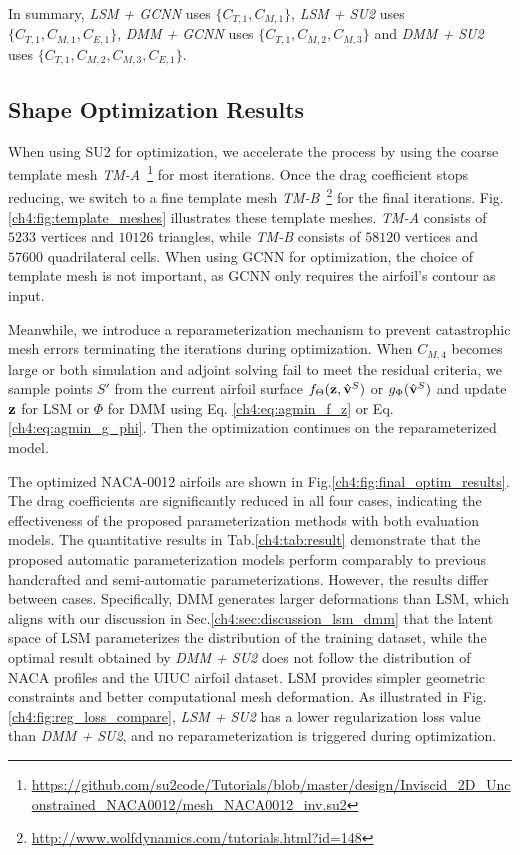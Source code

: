 In summary, \textit{LSM + GCNN} uses $\{C_{T,1},C_{M,1}\}$, \textit{LSM + SU2} uses $\{C_{T,1},C_{M,1},C_{E,1}\}$, \textit{DMM + GCNN} uses $\{C_{T,1},C_{M,2},C_{M,3}\}$ and \textit{DMM + SU2} uses $\{C_{T,1},C_{M,2},C_{M,3},C_{E,1}\}$.




\subsection{Shape Optimization Results}
When using SU2 for optimization, we accelerate the process by using the coarse template mesh \textit{TM-A}~\footnote{\url{https://github.com/su2code/Tutorials/blob/master/design/Inviscid_2D_Unconstrained_NACA0012/mesh_NACA0012_inv.su2}} for most iterations. Once the drag coefficient stops reducing, we switch to a fine template mesh \textit{TM-B}~\footnote{\url{http://www.wolfdynamics.com/tutorials.html?id=148}} for the final iterations. Fig.\ref{ch4:fig:template_meshes} illustrates these template meshes. \textit{TM-A} consists of $5233$ vertices and $10126$ triangles, while \textit{TM-B} consists of $58120$ vertices and $57600$ quadrilateral cells.
When using GCNN for optimization, the choice of template mesh is not important, as GCNN only requires the airfoil's contour as input.

Meanwhile, we introduce a reparameterization mechanism to prevent catastrophic mesh errors terminating the iterations during optimization. When $C_{M,4}$ becomes large or both simulation and adjoint solving fail to meet the residual criteria, we sample points $S'$ from the current airfoil surface $f_{\Theta}(\mathbf{z},\hat{\mathbf{v}}^S)$ or $g_{\Phi}(\hat{\mathbf{v}}^S)$ and update $\mathbf{z}$ for LSM or $\Phi$ for DMM using Eq. \ref{ch4:eq:agmin_f_z} or Eq. \ref{ch4:eq:agmin_g_phi}. Then the optimization continues on the reparameterized model.





The optimized NACA-0012 airfoils are shown in Fig.\ref{ch4:fig:final_optim_results}. The drag coefficients are significantly reduced in all four cases, indicating the effectiveness of the proposed parameterization methods with both evaluation models. The quantitative results in Tab.\ref{ch4:tab:result} demonstrate that the proposed automatic parameterization models perform comparably to previous handcrafted and semi-automatic parameterizations. However, the results differ between cases. Specifically, DMM generates larger deformations than LSM, which aligns with our discussion in Sec.\ref{ch4:sec:discussion_lsm_dmm} that the latent space of LSM parameterizes the distribution of the training dataset, while the optimal result obtained by \textit{DMM + SU2} does not follow the distribution of NACA profiles and the UIUC airfoil dataset. LSM provides simpler geometric constraints and better computational mesh deformation. As illustrated in Fig.\ref{ch4:fig:reg_loss_compare}, \textit{LSM + SU2} has a lower regularization loss value than \textit{DMM + SU2}, and no reparameterization is triggered during optimization.

